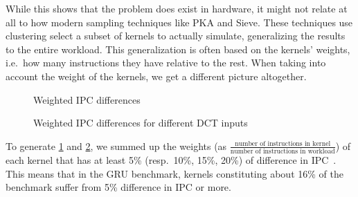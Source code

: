 While this shows that the problem does exist in hardware, it might not relate at all to how modern sampling techniques like PKA\cite{pks} and Sieve\cite{sieve}.
These techniques use clustering select a subset of kernels to actually simulate, generalizing the results to the entire workload.
This generalization is often based on the kernels' weights, i.e.\ how many instructions they have relative to the rest.
When taking into account the weight of the kernels, we get a different picture altogether.

\begin{figure}
    \centering
    \begin{minipage}[c]{0.45\textwidth}
        \resizebox{\textwidth}{!}{}
    \end{minipage}
    \begin{minipage}[c]{0.45\textwidth}
        \resizebox{\textwidth}{!}{}
    \end{minipage}
    \caption{Weighted IPC differences}
    \label{fig:weight_ipc_diff}
\end{figure}
\begin{figure}
    \centering
    \begin{minipage}[c]{0.45\textwidth}
        \resizebox{\textwidth}{!}{}
    \end{minipage}
    \begin{minipage}[c]{0.45\textwidth}
        \resizebox{\textwidth}{!}{}
    \end{minipage}
    \caption{Weighted IPC differences for different DCT inputs}
    \label{fig:weight_ipc_dct}
\end{figure}

To generate \cref{fig:weight_ipc_diff} and \cref{fig:weight_ipc_dct}, we summed up the weights (as $\frac{\text{number of instructions in kernel}}{\text{number of instructions in workload}}$) of each kernel that has at least 5\% (resp.\ 10\%, 15\%, 20\%) of difference in IPC\ .
This means that in the GRU benchmark, kernels constituting about 16\% of the benchmark suffer from 5\% difference in IPC or more.
\FloatBarrier